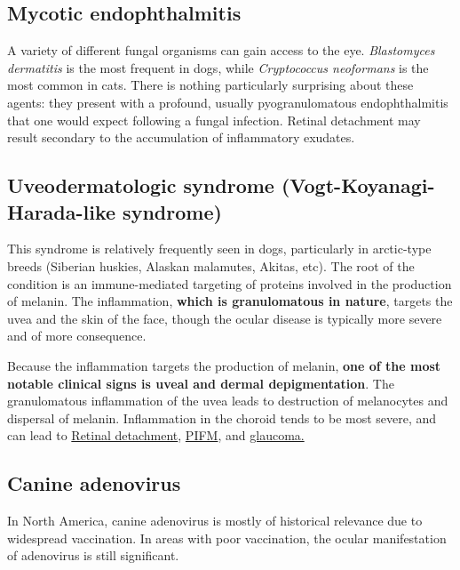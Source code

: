 \documentclass[
  openany]{article}
\begin{document}
\hypertarget{mycotic-endophthalmitis}{%
\subsection{Mycotic endophthalmitis}\label{mycotic-endophthalmitis}}

A variety of different fungal organisms can gain access to the eye. \emph{Blastomyces dermatitis} is the most frequent in dogs, while \emph{Cryptococcus neoformans} is the most common in cats. There is nothing particularly surprising about these agents: they present with a profound, usually pyogranulomatous endophthalmitis that one would expect following a fungal infection. Retinal detachment may result secondary to the accumulation of inflammatory exudates.

\hypertarget{uveodermatologic-syndrome-vogt-koyanagi-harada-like-syndrome}{%
\subsection{Uveodermatologic syndrome (Vogt-Koyanagi-Harada-like syndrome)}\label{uveodermatologic-syndrome-vogt-koyanagi-harada-like-syndrome}}

This syndrome is relatively frequently seen in dogs, particularly in arctic-type breeds (Siberian huskies, Alaskan malamutes, Akitas, etc). The root of the condition is an immune-mediated targeting of proteins involved in the production of melanin. The inflammation, \textbf{which is granulomatous in nature}, targets the uvea and the skin of the face, though the ocular disease is typically more severe and of more consequence.

Because the inflammation targets the production of melanin, \textbf{one of the most notable clinical signs is uveal and dermal depigmentation}. The granulomatous inflammation of the uvea leads to destruction of melanocytes and dispersal of melanin. Inflammation in the choroid tends to be most severe, and can lead to \protect\hyperlink{retinal-detachment}{Retinal detachment}, \protect\hyperlink{pre-iridial-fibrovascular-membranes-pifm}{PIFM}, and \protect\hyperlink{glaucoma}{glaucoma.}

\hypertarget{canine-adenovirus}{%
\subsection{Canine adenovirus}\label{canine-adenovirus}}

In North America, canine adenovirus is mostly of historical relevance due to widespread vaccination. In areas with poor vaccination, the ocular manifestation of adenovirus is still significant.
\end{document}

